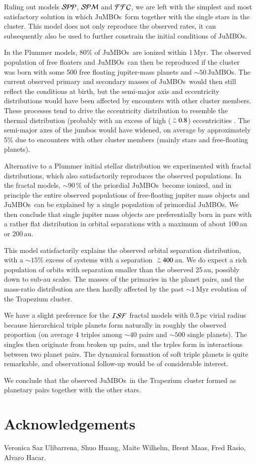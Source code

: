 \documentclass[aa]{lib/aa}
\def\apgt{\ {\raise-.5ex\hbox{$\buildrel>\over\sim$}}\ }
\newcommand{\jumbos}{\mbox{JuMBOs}}
\begin{document}
Ruling out models ${\cal SPP}$, ${\cal SPM}$ and ${\cal FFC}$, we are
left with the simplest and most satisfactory solution in which
\jumbos\, form together with the single stars in the cluster.  This
model does not only reproduce the observed rates, it can subsequently
also be used to further constrain the initial conditions of \jumbos.

In the Plummer models, 80\% of \jumbos\, are ionized within 1\,Myr.
The observed population of free floaters and \jumbos\, can then be
reproduced if the cluster was born with some 500 free floating
jupiter-mass planets and $\sim 50$\,\jumbos. The current observed
primary and secondary masses of \jumbos\, would then still reflect the
conditions at birth, but the semi-major axis and eccentricity
distributions would have been affected by encounters with other
cluster members. These processes tend to drive the eccentricity
distribution to resemble the thermal distribution (probably with an
excess of high ($\apgt 0.8$) eccentricities \cite{SPZMcM2000}. The
semi-major axes of the jumbos would have widened, on average by
approximately 5\% due to encounters with other cluster members
(mainly stars and free-floating planets).

Alternative to a Plummer initial stellar distribution we experimented
with fractal distributions, which also satisfactorily reproduces the
observed populations. In the fractal models, $\sim 90$\,\% of the
priordial \jumbos\, become ionized, and in principle the entire
observed populations of free-floating jupiter mass objects and
\jumbos\, can be explained by a single population of primordial
\jumbos. We then conclude that single jupiter mass objects are
preferentially born in pars with a rather flat distribution in orbital
separations with a maximum of about 100\,au or 200\,au.

This model satisfactorily explains the observed orbital separation
distribution, with a $\sim 15$\% excess of systems with a separation
$\apgt 400$\,au. We do expect a rich population of orbits with
separation smaller than the observed 25\,au, possibly down to sub-au
scales.  The masses of the primaries in the planet pairs, and the
mass-ratio distribution are then hardly affected by the past $\sim
1$\,Myr evolution of the Trapezium cluster.

We have a slight preference for the ${\cal ISF}$ fractal models with
0.5\,pc virial radius because hierarchical triple planets form
naturally in roughly the observed proportion (on average 4 triples
among $\sim 40$ pairs and $\sim 500$ single planets). The singles then
originate from broken up pairs, and the trples form in interactions
between two planet pairs. The dynamical formation of soft triple
planets is quite remarkable, and observational follow-up would be of
considerable interest.

We conclude that the observed \jumbos\, in the Trapezium cluster
formed as planetary pairs together with the other stars.

\section*{Acknowledgements}

Veronica Saz Ulibarrena, Shuo Huang, Maite Wilhelm, Brent Maas,
Fred Rasio, Alvaro Hacar.
    

    
\end{document}
